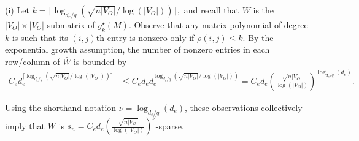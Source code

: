 \documentclass[opre,nonblindrev]{informs3} %
\begin{document}
\begin{APPENDIX}{}
\noindent{}

(i)
Let
$
k = \lceil \log_{d_e/q}(\sqrt{n|V_O|}/\log(|V_O|)) \rceil,
$
and recall that
$\bar W$ is the $|V_O| \times |V_O|$ submatrix
of $g^\star_k(M)$.
Observe that any matrix polynomial of degree $k$ is such that its $(i,j)$th entry is nonzero only if $\rho(i,j)\leq k$.
By the exponential growth assumption, the number of nonzero entries in each row/column
of $\bar W$ is bounded by
\begin{equation*}
\begin{aligned}
C_e d_e^{ \lceil \log_{d_e/q}(\sqrt{n|V_O|} /\log(|V_O|)) \rceil}
&\leq
C_e d_e d_e^{ \log_{d_e/q}( \sqrt{n|V_O|} /\log(|V_O|))  }
=
C_e d_e
\left(\frac{ \sqrt{n|V_O|}}{\log(|V_O|)} \right)^{\log_{d_e/q}(d_e)}.
\end{aligned}
\end{equation*}

Using the shorthand notation
$\nu=\log_{d_e/q}(d_e)$,
these observations collectively imply that
$\bar W$ is
$s_n= C_e d_e
\left(\frac{ \sqrt{n|V_O|}}{\log(|V_O|)} \right)^{\nu}
$-sparse.



\end{APPENDIX}
\end{document}
